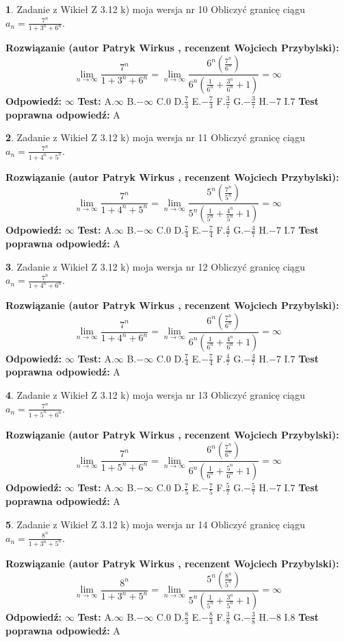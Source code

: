 \documentclass[12pt, a4paper]{article}
\theoremstyle{definition} %
\newtheorem{zad}{}
\newcommand{\zadStart}[1]{\begin{zad}#1\newline}
\newcommand{\zadStop}{\end{zad}}
\newcommand{\rozwStart}[2]{\noindent \textbf{Rozwiązanie (autor #1 , recenzent #2): }\newline}
\newcommand{\rozwStop}{\newline}
\newcommand{\odpStart}{\noindent \textbf{Odpowiedź:}\newline}
\newcommand{\odpStop}{\newline}
\newcommand{\testStart}{\noindent \textbf{Test:}\newline}
\newcommand{\testStop}{\newline}
\newcommand{\kluczStart}{\noindent \textbf{Test poprawna odpowiedź:}\newline}
\newcommand{\kluczStop}{\newline}
\begin{document}
\zadStart{Zadanie z Wikieł Z 3.12 k) moja wersja nr 10}
Obliczyć granicę ciągu $a_{n}=\frac{7^{n}}{1+3^{n} + 6^{n}}$.
\zadStop
\rozwStart{Patryk Wirkus}{Wojciech Przybylski}
$$\lim\limits_{n\to\infty}\frac{7^{n}}{1+3^{n} + 6^{n}}=
\lim\limits_{n\to\infty}\frac{6^{n}(\frac{7^{n}}{6^{n}} )}{6^{n}(\frac{1}{6^{n}}+\frac{3^{n}}{6^{n}}+1)} = \infty$$
\rozwStop
\odpStart
$\infty$
\odpStop
\testStart
A.$\infty$
B.$-\infty$
C.$0$
D.$\frac{7}{3}$
E.$-\frac{7}{3}$
F.$\frac{3}{7}$
G.$-\frac{3}{7}$
H.$-7$
I.$7$
\testStop
\kluczStart
A
\kluczStop



\zadStart{Zadanie z Wikieł Z 3.12 k) moja wersja nr 11}
Obliczyć granicę ciągu $a_{n}=\frac{7^{n}}{1+4^{n} + 5^{n}}$.
\zadStop
\rozwStart{Patryk Wirkus}{Wojciech Przybylski}
$$\lim\limits_{n\to\infty}\frac{7^{n}}{1+4^{n} + 5^{n}}=
\lim\limits_{n\to\infty}\frac{5^{n}(\frac{7^{n}}{5^{n}} )}{5^{n}(\frac{1}{5^{n}}+\frac{4^{n}}{5^{n}}+1)} = \infty$$
\rozwStop
\odpStart
$\infty$
\odpStop
\testStart
A.$\infty$
B.$-\infty$
C.$0$
D.$\frac{7}{4}$
E.$-\frac{7}{4}$
F.$\frac{4}{7}$
G.$-\frac{4}{7}$
H.$-7$
I.$7$
\testStop
\kluczStart
A
\kluczStop



\zadStart{Zadanie z Wikieł Z 3.12 k) moja wersja nr 12}
Obliczyć granicę ciągu $a_{n}=\frac{7^{n}}{1+4^{n} + 6^{n}}$.
\zadStop
\rozwStart{Patryk Wirkus}{Wojciech Przybylski}
$$\lim\limits_{n\to\infty}\frac{7^{n}}{1+4^{n} + 6^{n}}=
\lim\limits_{n\to\infty}\frac{6^{n}(\frac{7^{n}}{6^{n}} )}{6^{n}(\frac{1}{6^{n}}+\frac{4^{n}}{6^{n}}+1)} = \infty$$
\rozwStop
\odpStart
$\infty$
\odpStop
\testStart
A.$\infty$
B.$-\infty$
C.$0$
D.$\frac{7}{4}$
E.$-\frac{7}{4}$
F.$\frac{4}{7}$
G.$-\frac{4}{7}$
H.$-7$
I.$7$
\testStop
\kluczStart
A
\kluczStop



\zadStart{Zadanie z Wikieł Z 3.12 k) moja wersja nr 13}
Obliczyć granicę ciągu $a_{n}=\frac{7^{n}}{1+5^{n} + 6^{n}}$.
\zadStop
\rozwStart{Patryk Wirkus}{Wojciech Przybylski}
$$\lim\limits_{n\to\infty}\frac{7^{n}}{1+5^{n} + 6^{n}}=
\lim\limits_{n\to\infty}\frac{6^{n}(\frac{7^{n}}{6^{n}} )}{6^{n}(\frac{1}{6^{n}}+\frac{5^{n}}{6^{n}}+1)} = \infty$$
\rozwStop
\odpStart
$\infty$
\odpStop
\testStart
A.$\infty$
B.$-\infty$
C.$0$
D.$\frac{7}{5}$
E.$-\frac{7}{5}$
F.$\frac{5}{7}$
G.$-\frac{5}{7}$
H.$-7$
I.$7$
\testStop
\kluczStart
A
\kluczStop



\zadStart{Zadanie z Wikieł Z 3.12 k) moja wersja nr 14}
Obliczyć granicę ciągu $a_{n}=\frac{8^{n}}{1+3^{n} + 5^{n}}$.
\zadStop
\rozwStart{Patryk Wirkus}{Wojciech Przybylski}
$$\lim\limits_{n\to\infty}\frac{8^{n}}{1+3^{n} + 5^{n}}=
\lim\limits_{n\to\infty}\frac{5^{n}(\frac{8^{n}}{5^{n}} )}{5^{n}(\frac{1}{5^{n}}+\frac{3^{n}}{5^{n}}+1)} = \infty$$
\rozwStop
\odpStart
$\infty$
\odpStop
\testStart
A.$\infty$
B.$-\infty$
C.$0$
D.$\frac{8}{3}$
E.$-\frac{8}{3}$
F.$\frac{3}{8}$
G.$-\frac{3}{8}$
H.$-8$
I.$8$
\testStop
\kluczStart
A
\kluczStop
\end{document}
